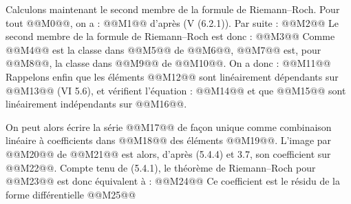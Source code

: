 
Calculons maintenant le second membre de la formule de Riemann--Roch. Pour tout @@M0@@, on a :
@@M1@@
d'après (V (6.2.1)). Par suite :
@@M2@@
Le second membre de la formule de Riemann--Roch est donc :
@@M3@@
Comme @@M4@@ est la classe dans @@M5@@ de @@M6@@, @@M7@@ est, pour @@M8@@, la classe dans
@@M9@@ de @@M10@@. On a donc :
@@M11@@
Rappelons enfin que les éléments @@M12@@ sont linéairement dépendants sur @@M13@@ (VI 5.6), et vérifient l'équation :
@@M14@@
et que @@M15@@ sont linéairement indépendants sur @@M16@@.

On peut alors écrire la série @@M17@@ de façon unique comme combinaison linéaire à coefficients dans
@@M18@@ des éléments @@M19@@. L'image par @@M20@@ de @@M21@@ est alors, d'après (5.4.4) et 3.7, son coefficient sur @@M22@@. Compte tenu de (5.4.1), le théorème de Riemann--Roch pour @@M23@@ est donc équivalent à :
@@M24@@
Ce coefficient est le résidu de la forme différentielle
@@M25@@

